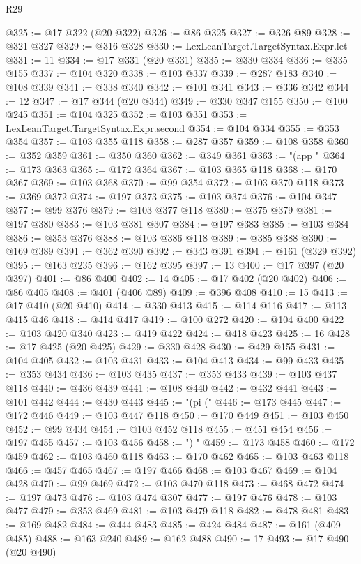 \begin{lexlean}{R29}
\begin{coremodule}
@325 := @17 @322 (@20 @322)
@326 := @86 @325
@327 := @326 @89
@328 := @321 @327
@329 := @316 @328
@330 := LexLeanTarget.TargetSyntax.Expr.let
@331 := 11
@334 := @17 @331 (@20 @331)
@335 := @330 @334
@336 := @335 @155
@337 := @104 @320
@338 := @103 @337
@339 := @287 @183
@340 := @108 @339
@341 := @338 @340
@342 := @101 @341
@343 := @336 @342
@344 := 12
@347 := @17 @344 (@20 @344)
@349 := @330 @347 @155
@350 := @100 @245
@351 := @104 @325
@352 := @103 @351
@353 := LexLeanTarget.TargetSyntax.Expr.second
@354 := @104 @334
@355 := @353 @354
@357 := @103 @355 @118
@358 := @287 @357
@359 := @108 @358
@360 := @352 @359
@361 := @350 @360
@362 := @349 @361
@363 := "(app "
@364 := @173 @363
@365 := @172 @364
@367 := @103 @365 @118
@368 := @170 @367
@369 := @103 @368
@370 := @99 @354
@372 := @103 @370 @118
@373 := @369 @372
@374 := @197 @373
@375 := @103 @374
@376 := @104 @347
@377 := @99 @376
@379 := @103 @377 @118
@380 := @375 @379
@381 := @197 @380
@383 := @103 @381 @307
@384 := @197 @383
@385 := @103 @384
@386 := @353 @376
@388 := @103 @386 @118
@389 := @385 @388
@390 := @169 @389
@391 := @362 @390
@392 := @343 @391
@394 := @161 (@329 @392)
@395 := @163 @235
@396 := @162 @395
@397 := 13
@400 := @17 @397 (@20 @397)
@401 := @86 @400
@402 := 14
@405 := @17 @402 (@20 @402)
@406 := @86 @405
@408 := @401 (@406 @89)
@409 := @396 @408
@410 := 15
@413 := @17 @410 (@20 @410)
@414 := @330 @413
@415 := @114 @116
@417 := @113 @415 @46
@418 := @414 @417
@419 := @100 @272
@420 := @104 @400
@422 := @103 @420 @340
@423 := @419 @422
@424 := @418 @423
@425 := 16
@428 := @17 @425 (@20 @425)
@429 := @330 @428
@430 := @429 @155
@431 := @104 @405
@432 := @103 @431
@433 := @104 @413
@434 := @99 @433
@435 := @353 @434
@436 := @103 @435
@437 := @353 @433
@439 := @103 @437 @118
@440 := @436 @439
@441 := @108 @440
@442 := @432 @441
@443 := @101 @442
@444 := @430 @443
@445 := "(pi ("
@446 := @173 @445
@447 := @172 @446
@449 := @103 @447 @118
@450 := @170 @449
@451 := @103 @450
@452 := @99 @434
@454 := @103 @452 @118
@455 := @451 @454
@456 := @197 @455
@457 := @103 @456
@458 := ") "
@459 := @173 @458
@460 := @172 @459
@462 := @103 @460 @118
@463 := @170 @462
@465 := @103 @463 @118
@466 := @457 @465
@467 := @197 @466
@468 := @103 @467
@469 := @104 @428
@470 := @99 @469
@472 := @103 @470 @118
@473 := @468 @472
@474 := @197 @473
@476 := @103 @474 @307
@477 := @197 @476
@478 := @103 @477
@479 := @353 @469
@481 := @103 @479 @118
@482 := @478 @481
@483 := @169 @482
@484 := @444 @483
@485 := @424 @484
@487 := @161 (@409 @485)
@488 := @163 @240
@489 := @162 @488
@490 := 17
@493 := @17 @490 (@20 @490)

\end{coremodule}
\end{lexlean}
